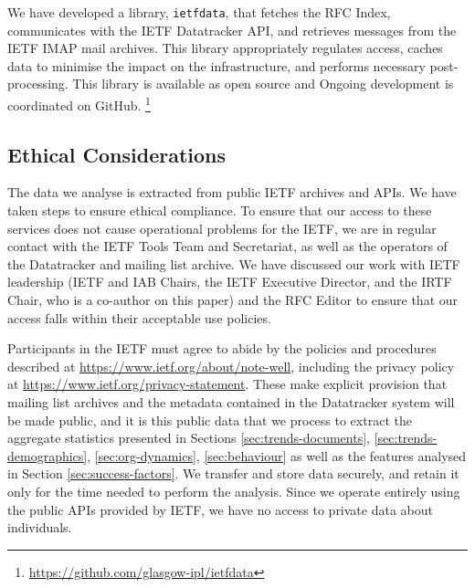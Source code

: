 \documentclass[twocolumn,10pt]{article}
\newcommand{\pb}[1]{\vspace{0.75ex}\noindent{\textbf{#1}}}
\begin{document}

\pb{Reproducibility and data access:}
We have developed a library, \texttt{ietfdata}, that fetches the RFC
Index, communicates with the IETF Datatracker API, and retrieves messages
from the IETF IMAP mail archives. This library appropriately regulates
access, caches data to minimise the impact on the infrastructure, and
performs necessary post-processing. This library is available as open
source and Ongoing development is coordinated on GitHub.%
\footnote{\url{https://github.com/glasgow-ipl/ietfdata}}


\subsection{Ethical Considerations}
\label{sec:ethics}


The data we analyse is extracted from public IETF archives and APIs.  We
have taken steps to ensure ethical compliance.  To ensure that our access
to these services does not cause operational problems for the IETF, we are
in regular contact with the IETF Tools Team and Secretariat, as well as the
operators of the Datatracker and mailing list archive.  We have
discussed our work with IETF leadership (IETF and IAB Chairs, the IETF
Executive Director, and the IRTF Chair, who is a co-author on this paper)
and the RFC Editor to ensure that our access falls within their acceptable
use policies.

Participants in the IETF must agree to abide by the policies and procedures
described at \url{https://www.ietf.org/about/note-well}, including the privacy
policy at \url{https://www.ietf.org/privacy-statement}. These make explicit
provision that mailing list archives and the metadata contained in the
Datatracker system will be made public, and it is this public data that
we process to extract the aggregate statistics presented in Sections
\ref{sec:trends-documents}, \ref{sec:trends-demographics}, \ref{sec:org-dynamics},
\ref{sec:behaviour} as well as the features analysed in Section
\ref{sec:success-factors}. We transfer and store data securely, and retain
it only for the time needed to perform the analysis.  Since we operate
entirely using the public APIs provided by IETF, we have no access to
private data about individuals.
\end{document}
